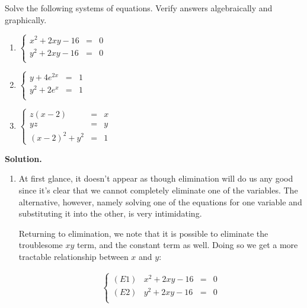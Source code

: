 \begin{ex}  \label{nonlinearex2} Solve the following systems of equations.  Verify answers algebraically and graphically.

\begin{multicols}{3}

\begin{enumerate}

\item  $\left\{\begin{array}{rcl}  x^2 +2xy -16 & = & 0 \\ y^2 +2xy -16 & = & 0 \\ \end{array} \right.$

\item  $\left\{\begin{array}{rcl}  y+4e^{2x} & = & 1 \\y^2 + 2e^{x} & = & 1 \\ \end{array} \right.$

\item  $\left\{\begin{array}{rcl}   z(x-2) & = & x \\ yz & = & y \\ (x-2)^2+y^2 & = & 1 \end{array} \right.$


\end{enumerate}

\end{multicols}

{\bf Solution.}

\begin{enumerate}

\item  At first glance, it doesn't appear as though elimination will do us any good since it's clear that we cannot  completely eliminate one of the variables.  The alternative, however, namely solving one of the equations for one variable and substituting it into the other, is very intimidating.

Returning to elimination,  we note that it is possible to eliminate the troublesome $xy$ term, and the constant term as well. Doing so we get a more tractable relationship between $x$ and $y$:

\[ \begin{array}{ccc}

\left\{\begin{array}{lrcr} (E1) & x^2 +2xy -16 & = & 0 \\ (E2) & y^2 +2xy -16 & = & 0 \\ \end{array} \right.


\end{array}\]
\end{enumerate}
\end{ex}
